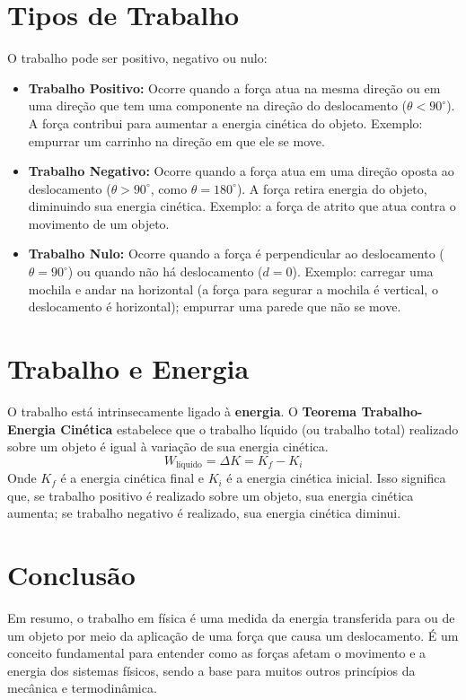 \documentclass{article}
\begin{document}
\section{Tipos de Trabalho}
O trabalho pode ser positivo, negativo ou nulo:
\begin{itemize}
    \item \textbf{Trabalho Positivo:} Ocorre quando a força atua na mesma direção ou em uma direção que tem uma componente na direção do deslocamento ($\theta < 90^\circ$). A força contribui para aumentar a energia cinética do objeto. Exemplo: empurrar um carrinho na direção em que ele se move.
    \item \textbf{Trabalho Negativo:} Ocorre quando a força atua em uma direção oposta ao deslocamento ($\theta > 90^\circ$, como $\theta = 180^\circ$). A força retira energia do objeto, diminuindo sua energia cinética. Exemplo: a força de atrito que atua contra o movimento de um objeto.
    \item \textbf{Trabalho Nulo:} Ocorre quando a força é perpendicular ao deslocamento ($\theta = 90^\circ$) ou quando não há deslocamento ($d=0$). Exemplo: carregar uma mochila e andar na horizontal (a força para segurar a mochila é vertical, o deslocamento é horizontal); empurrar uma parede que não se move.
\end{itemize}

\section{Trabalho e Energia}
O trabalho está intrinsecamente ligado à \textbf{energia}. O \textbf{Teorema Trabalho-Energia Cinética} estabelece que o trabalho líquido (ou trabalho total) realizado sobre um objeto é igual à variação de sua energia cinética.
$$ W_{\text{líquido}} = \Delta K = K_f - K_i $$
Onde $K_f$ é a energia cinética final e $K_i$ é a energia cinética inicial. Isso significa que, se trabalho positivo é realizado sobre um objeto, sua energia cinética aumenta; se trabalho negativo é realizado, sua energia cinética diminui.

\section{Conclusão}
Em resumo, o trabalho em física é uma medida da energia transferida para ou de um objeto por meio da aplicação de uma força que causa um deslocamento. É um conceito fundamental para entender como as forças afetam o movimento e a energia dos sistemas físicos, sendo a base para muitos outros princípios da mecânica e termodinâmica.
\end{document}
